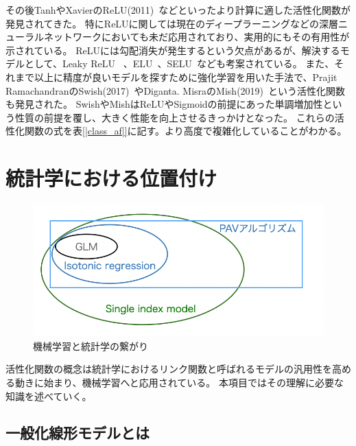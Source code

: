 その後TanhやXavierのReLU(2011)~\cite{ReLU}などといったより計算に適した活性化関数が発見されてきた。
特にReLUに関しては現在のディープラーニングなどの深層ニューラルネットワークにおいても未だ応用されており、実用的にもその有用性が示されている。
ReLUには勾配消失が発生するという欠点があるが、解決するモデルとして、Leaky ReLU ~\cite{leaky_relu}、ELU~\cite{elu}、SELU~\cite{selu}なども考案されている。
また、それまで以上に精度が良いモデルを探すために強化学習を用いた手法で、Prajit RamachandranのSwish(2017)~\cite{swish}やDiganta. MisraのMish(2019)~\cite{Mish}という活性化関数も発見された。
SwishやMishはReLUやSigmoidの前提にあった単調増加性という性質の前提を覆し、大きく性能を向上させるきっかけとなった。
これらの活性化関数の式を表\ref{|class_af|}に記す。より高度で複雑化していることがわかる。

\section{統計学における位置付け}

\begin{figure}[hbtp]
        \includegraphics[width=15cm]{asset/machine_statistics.png}
            \caption{機械学習と統計学の繋がり}
            \label{glm}
\end{figure}

活性化関数の概念は統計学におけるリンク関数と呼ばれるモデルの汎用性を高める動きに始まり、機械学習へと応用されている。
本項目ではその理解に必要な知識を述べていく。



\subsection{一般化線形モデルとは}


